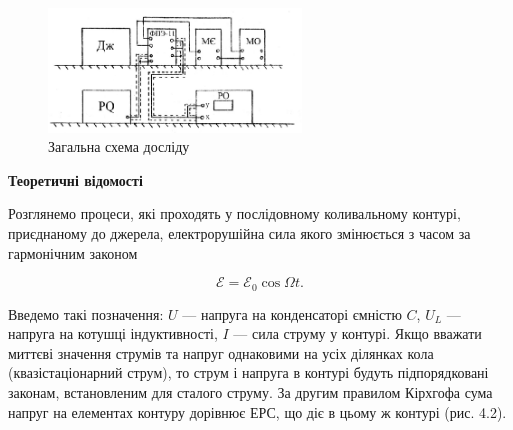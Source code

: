 \documentclass[12pt,a4paper]{article}
\begin{document}
    \begin{figure}[h!]

        \renewcommand{\thefigure}{4.\arabic{figure}} %

        \centering
        \includegraphics[width=0.6\textwidth]{main_schemma.png}
        \caption{Загальна схема досліду}
        \label{fig1:schema}

    \end{figure}


    \begin{center}
        \textbf{\Large Теоретичні відомості}
    \end{center}

    \setlength{\parindent}{1.5em}

    Розглянемо процеси, які проходять у послідовному коливальному контурі, приєднаному до джерела, електрорушійна сила якого змінюється з часом за гармонічним законом

    \begin{equation}
        \mathcal{E} = \mathcal{E}_0 \cos \Omega t.
        \tag{4.1}
    \end{equation}

    Введемо такі позначення:
    $U$ --- напруга на конденсаторі ємністю $C$,
    $U_L$ --- напруга на котушці індуктивності, $I$ --- сила струму у контурі.
    Якщо вважати миттєві значення струмів та напруг однаковими на усіх ділянках кола
    (квазістаціонарний струм), то струм і напруга в контурі будуть підпорядковані законам,
    встановленим для сталого струму. За другим правилом Кірхгофа сума напруг на елементах контуру дорівнює ЕРС, що діє в цьому ж контурі (рис. 4.2).
    
\end{document}
